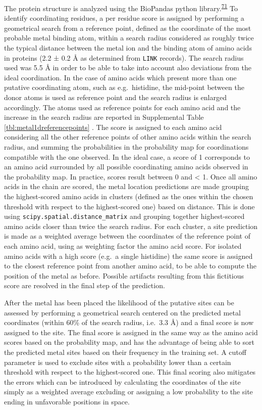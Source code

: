 \documentclass[  ASAPversion,
  ,
  9pt]{elife}
\begin{document}
The protein structure is analyzed using the BioPandas python library.\textsuperscript{\protect\hyperlink{ref-CcRTAd7h}{71}} To identify coordinating residues, a per residue score is assigned by performing a geometrical search from a reference point, defined as the coordinate of the most probable metal binding atom, within a search radius considered as roughly twice the typical distance between the metal ion and the binding atom of amino acids in proteins (2.2 ± 0.2 Å as determined from \texttt{LINK} records). The search radius used was 5.5 Å in order to be able to take into account also deviations from the ideal coordination. In the case of amino acids which present more than one putative coordinating atom, such as e.g.~histidine, the mid-point between the donor atoms is used as reference point and the search radius is enlarged accordingly. The atoms used as reference points for each amino acid and the increase in the search radius are reported in Supplemental Table \ref{tbl:metal1dreferencepoints} .
The score is assigned to each amino acid considering all the other reference points of other amino acids within the search radius, and summing the probabilities in the probability map for coordinations compatible with the one observed. In the ideal case, a score of 1 corresponds to an amino acid surrounded by all possible coordinating amino acids observed in the probability map. In practice, scores result between 0 and \textless{} 1. Once all amino acids in the chain are scored, the metal location predictions are made grouping the highest-scored amino acids in clusters (defined as the ones within the chosen threshold with respect to the highest-scored one) based on distance. This is done using \texttt{scipy.spatial.distance\_matrix} and grouping together highest-scored amino acids closer than twice the search radius. For each cluster, a site prediction is made as a weighted average between the coordinates of the reference point of each amino acid, using as weighting factor the amino acid score. For isolated amino acids with a high score (e.g.~a single histidine) the same score is assigned to the closest reference point from another amino acid, to be able to compute the position of the metal as before. Possible artifacts resulting from this fictitious score are resolved in the final step of the prediction.

After the metal has been placed the likelihood of the putative sites can be assessed by performing a geometrical search centered on the predicted metal coordinates (within 60\% of the search radius, i.e.~3.3 Å) and a final score is now assigned to the site. The final score is assigned in the same way as the amino acid scores based on the probability map, and has the advantage of being able to sort the predicted metal sites based on their frequency in the training set. A cutoff parameter is used to exclude sites with a probability lower than a certain threshold with respect to the highest-scored one. This final scoring also mitigates the errors which can be introduced by calculating the coordinates of the site simply as a weighted average excluding or assigning a low probability to the site ending in unfavorable positions in space.
\end{document}
